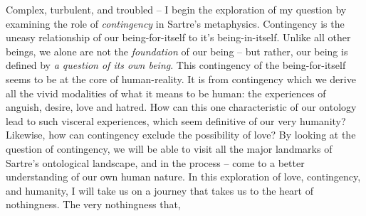 Complex, turbulent, and troubled -- I begin the exploration of my question by examining the role of \emph{contingency} in Sartre's metaphysics.
Contingency is the uneasy relationship of our being-for-itself to it's being-in-itself. Unlike all other beings, we alone are not the \emph{foundation} of our being -- but rather, our being is defined by \emph{a question of its own being}. This contingency of the being-for-itself seems to be at the core of human-reality. It is from contingency which we derive all the vivid modalities of what it means to be human: the experiences of anguish, desire, love and hatred. How can this one characteristic of our ontology lead to such visceral experiences, which seem definitive of our very humanity? Likewise, how can contingency exclude the possibility of love? By looking at the question of contingency, we will be able to visit all the major landmarks of Sartre's ontological landscape, and in the process -- come to a better understanding of our own human nature. In this exploration of love, contingency, and humanity, I will take us on a journey that takes us to the heart of nothingness. The very nothingness that, 